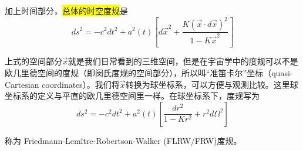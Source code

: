 \documentclass[12pt]{ctexart}
\begin{document}
加上时间部分，\colorbox{yellow}{总体的时空度规}是 
\begin{equation}
    ds^2=-c^2dt^2 + a^2(t) \left[d\vec{x}^2 +  \frac{K(\vec{x} \cdot d\vec{x})^2}{1-K \vec{x}^2}\right]
\end{equation}

上式的空间部分$\vec{x}$就是我们日常看到的三维空间，但是在宇宙学中的度规可以不是欧几里德空间的度规（即闵氏度规的空间部分），所以叫“准笛卡尔”坐标（quasi-Cartesian coordinates）。我们将$\vec{x}$转换为球坐标系，可以方便与观测比较。这里球坐标系的定义与平直的欧几里德空间里一样。在球坐标系下，度规写为
\begin{equation}
    ds^2=-c^2dt^2 + a^2(t) \left[ \frac{dr^2}{1-Kr^2} + r^2 d\Omega^2 \right]
\end{equation}

称为 Friedmann-Lemître-Robertson-Walker (FLRW/FRW)度规。
\end{document}
